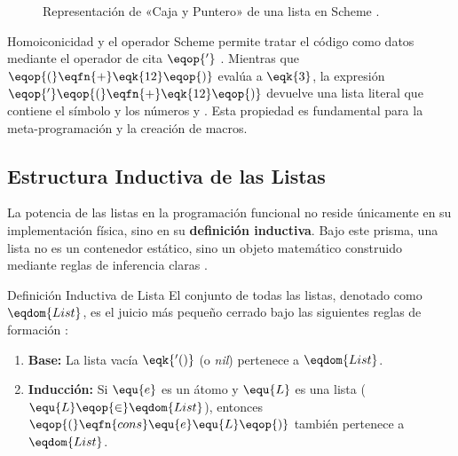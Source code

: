 \begin{figure}[htbp]
    \centering
    \caption{Representación de «Caja y Puntero» de una lista en Scheme \cite{SICP}.}
    \label{fig:box_and_pointer}
\end{figure}

\begin{observacion}{Homoiconicidad y el operador }
Scheme permite tratar el código como datos mediante el operador de cita $\eqop{'}$ \cite{SICP}. Mientras que $\eqop{(}\eqfn{+} \eqk{1 2}\eqop{)}$ evalúa a $\eqk{3}$, la expresión $\eqop{'}\eqop{(}\eqfn{+} \eqk{1 2}\eqop{)}$ devuelve una lista literal que contiene el símbolo \eqfn{+} y los números  y  \cite{SICP}. Esta propiedad es fundamental para la meta-programación y la creación de macros.
\end{observacion}


\subsection{Estructura Inductiva de las Listas}
\label{subsec:4_3_2_estructura_inductiva}

La potencia de las listas en la programación funcional no reside únicamente en su implementación física, sino en su \textbf{definición inductiva}. Bajo este prisma, una lista no es un contenedor estático, sino un objeto matemático construido mediante reglas de inferencia claras \cite{PFPL, HtDP}.

\begin{definicion}{Definición Inductiva de Lista}
El conjunto de todas las listas, denotado como $\eqdom{List}$, es el juicio más pequeño cerrado bajo las siguientes reglas de formación \cite{PFPL, HtDP}:
\begin{enumerate}
    \item \textbf{Base:} La lista vacía $\eqk{'()}$ (o \textit{nil}) pertenece a $\eqdom{List}$.
    \item \textbf{Inducción:} Si $\equ{e}$ es un átomo y $\equ{L}$ es una lista ($\equ{L} \eqop{\in} \eqdom{List}$), entonces $\eqop{(}\eqfn{cons} \equ{e} \equ{L}\eqop{)}$ también pertenece a $\eqdom{List}$.
\end{enumerate}
\end{definicion}

